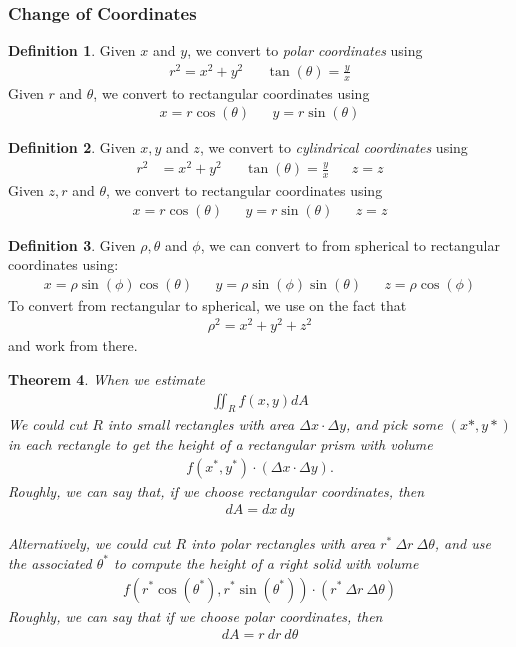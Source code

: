 \documentclass{article}[11pt]
\newtheorem{theorem}{Theorem}[section]
\theoremstyle{definition}
\newtheorem{definition}[theorem]{Definition}
\numberwithin{equation}{section}
\begin{document}
\subsubsection{Change of Coordinates}
\begin{definition}
	Given \(x\) and \(y\), we convert to \emph{polar coordinates} using
	\begin{align*}
	r^2= x^2+y^2 && \tan(\theta) = \frac{y}{x}
	\end{align*}
	Given \(r\) and \(\theta\), we convert to rectangular coordinates using
	\begin{align*}
	x=r\cos(\theta) && y=r\sin(\theta)
	\end{align*}
\end{definition}
\begin{definition}
	Given \(x,y\) and \(z\), we convert to \emph{cylindrical coordinates} using
	\begin{align*}
	r^2 &= x^2+y^2 && \tan(\theta)= \frac{y}{x} && z=z
	\end{align*}
	Given \(z, r\) and \(\theta\), we convert to rectangular coordinates using
	\begin{align*}
	x=r\cos(\theta) && y=r\sin(\theta) && z=z
	\end{align*}
\end{definition}
\begin{definition}
	Given \(\rho, \theta\) and \(\phi\), we can convert to from spherical to rectangular coordinates using:
	\begin{align*}
	x=\rho\sin(\phi) \cos(\theta) && y=\rho\sin(\phi) \sin(\theta) && z=\rho\cos(\phi)
	\end{align*}
	To convert from rectangular to spherical, we use on the fact that
	\begin{align*}
	\rho^2=x^2+y^2+z^2
	\end{align*}
	and work from there.
\end{definition}
\begin{theorem}
	When we estimate
	\begin{align*}
	\iint_R f(x,y) dA
	\end{align*}
	We could cut \(R\) into small rectangles with area \(\Delta x \cdot \Delta y\), and pick some \((x*,y*)\) in each rectangle to get the height of a rectangular prism with volume
	\begin{align*}
	f(x^*,y^*)\cdot \left(\Delta x \cdot \Delta y\right).
	\end{align*}
	Roughly, we can say that, if we choose rectangular coordinates, then \begin{align}
	dA=dx\:dy
	\end{align}
	
	Alternatively, we could cut \(R\) into polar rectangles with area \( r^* \: \Delta r \: \Delta \theta \), and use the associated \(\theta^*\) to compute the height of a right solid with volume
	\begin{align*}
	f(r^*\cos(\theta^*),r^*\sin(\theta^*))\cdot \left(r^* \: \Delta r \: \Delta \theta\right)
	\end{align*}
	Roughly, we can say that if we choose polar coordinates, then 
	\begin{align}
	dA=r\:dr\:d\theta
	\end{align}
\end{theorem}
\end{document}
